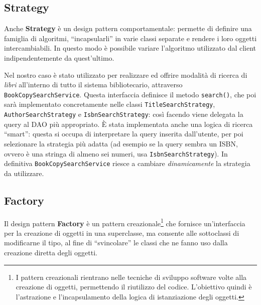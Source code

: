 \documentclass[
  italian,
  paper=a4,
  ,captions=tableheading
]{scrbook}
\newcommand{\passthrough}[1]{#1}
\begin{document}
\subsection{Strategy}\label{strategy}

Anche \textbf{Strategy} è un design pattern
comportamentale\footnotemark[3]: permette di definire una famiglia di
algoritmi, ``incapsularli'' in varie classi separate e rendere i loro
oggetti intercambiabili. In questo modo è possibile variare l'algoritmo
utilizzato dal client indipendentemente da quest'ultimo.

Nel nostro caso è stato utilizzato per realizzare ed offrire modalità di
ricerca di \emph{libri} all'interno di tutto il sistema bibliotecario,
attraverso \passthrough{\lstinline!BookCopySearchService!}. Questa
interfaccia definisce il metodo \passthrough{\lstinline!search()!}, che
poi sarà implementato concretamente nelle classi
\passthrough{\lstinline!TitleSearchStrategy!},
\passthrough{\lstinline!AuthorSearchStrategy!} e
\passthrough{\lstinline!IsbnSearchStrategy!}: così facendo viene
delegata la query al DAO più appropriato. È stata implementata anche una
logica di ricerca ``smart'': questa si occupa di interpretare la query
inserita dall'utente, per poi selezionare la strategia più adatta (ad
esempio se la query sembra un ISBN, ovvero è una stringa di almeno sei
numeri, usa \passthrough{\lstinline!IsbnSearchStrategy!}). In definitiva
\passthrough{\lstinline!BookCopySearchService!} riesce a cambiare
\emph{dinamicamente} la strategia da utilizzare.

\subsection{Factory}\label{factory}

Il design pattern \textbf{Factory} è un pattern
creazionale\footnote{I pattern creazionali rientrano nelle tecniche di sviluppo software volte alla creazione di oggetti, permettendo il riutilizzo del codice. L’obiettivo quindi è l’astrazione e l’incapsulamento della logica di istanziazione degli oggetti.}
che fornisce un'interfaccia per la creazione di oggetti in una
superclasse, ma consente alle sottoclassi di modificarne il tipo, al
fine di ``svincolare'' le classi che ne fanno uso dalla creazione
diretta degli oggetti.
\end{document}
